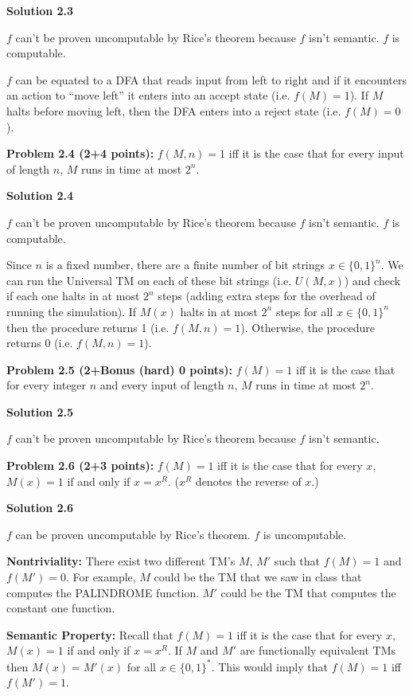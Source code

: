 \documentclass[11pt]{article}
\begin{document}
\textbf{Solution 2.3}

$f$ can't be proven uncomputable by Rice's theorem because $f$ isn't semantic. $f$ is computable.

$f$ can be equated to a DFA that reads input from left to right and if it encounters an action to ``move left'' it enters into an accept state (i.e. $f(M) = 1$). If $M$ halts before moving left, then the DFA enters into a reject state (i.e. $f(M) = 0$).

\newpage

\textbf{Problem 2.4 (2+4 points):}  $f(M,n) = 1$ iff it is the case that for every input of length $n$, $M$ runs in time at most $2^n$.

\textbf{Solution 2.4}

$f$ can't be proven uncomputable by Rice's theorem because $f$ isn't semantic. $f$ is computable.

Since $n$ is a fixed number, there are a finite number of bit strings $x \in \{0, 1\}^n$. We can run the Universal TM on each of these bit strings (i.e. $U(M, x)$) and check if each one halts in at most $2^n$ steps (adding extra steps for the overhead of running the simulation). If $M(x)$ halts in at most $2^n$ steps for all $x \in \{0, 1\}^n$ then the procedure returns 1 (i.e. $f(M,n) = 1$). Otherwise, the procedure returns 0 (i.e. $f(M,n) = 1$).

\newpage

\textbf{Problem 2.5 (2+Bonus (hard) 0 points):}  $f(M) = 1$ iff it is the case that for every integer $n$ and every input of length $n$, $M$ runs in time at most $2^n$.

\textbf{Solution 2.5}

$f$ can't be proven uncomputable by Rice's theorem because $f$ isn't semantic.

\newpage

\textbf{Problem 2.6 (2+3 points):}  $f(M) = 1$ iff it is the case that for every $x$, $M(x) = 1$ if and only if $x = x^R$. ($x^R$ denotes the reverse of $x$.)

\textbf{Solution 2.6}

$f$ can be proven uncomputable by Rice's theorem. $f$ is uncomputable.

\textbf{Nontriviality:} There exist two different TM's $M$, $M'$ such that $f(M) = 1$ and $f(M') = 0$. For example, $M$ could be the TM that we saw in class that computes the PALINDROME function. $M'$ could be the TM that computes the constant one function. 

\textbf{Semantic Property:} Recall that $f(M) = 1$ iff it is the case that for every $x$, $M(x) = 1$ if and only if $x = x^R$. If $M$ and $M'$ are functionally equivalent TMs then $M(x) = M'(x)$ for all $x \in \{0, 1\}^*$. This would imply that $f(M) = 1$ iff $f(M') = 1$.
\end{document}
